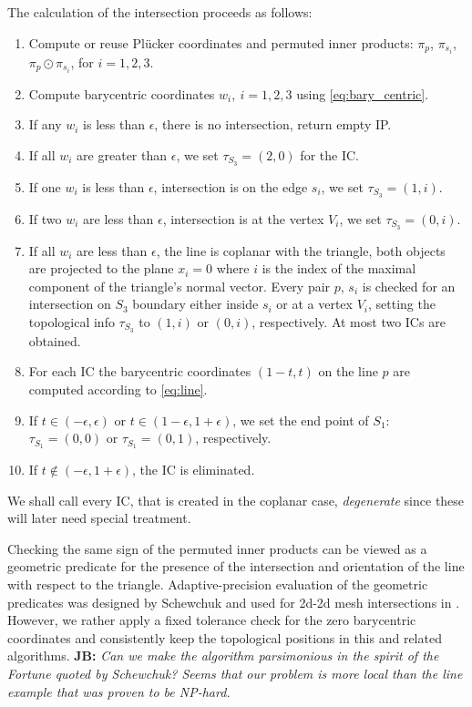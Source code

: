 \documentclass{elsarticle}
\newcommand{\noteJB}[1]{{\color{Blue} \textbf{JB: } \textit{#1}}}
\newcommand{\plucker}{Pl\"{u}cker }
\begin{document}
The calculation of the intersection proceeds as follows:
\begin{enumerate}
    \item Compute or reuse \plucker coordinates and permuted inner products: $\pi_p$, $\pi_{s_i}$, $\pi_p \odot \pi_{s_i}$, for $i=1,2,3$.
    \item Compute barycentric coordinates $w_i,\ i=1,2,3$ using \eqref{eq:bary_centric}.
    \item If any $w_i$ is less than $\epsilon$, there is no intersection, return empty IP.  
    \item If all $w_i$ are greater than $\epsilon$, we set $\tau_{S_3} = (2, 0)$ for the IC.
    \item If one $w_i$ is less than $\epsilon$, intersection is on the edge $s_i$, we set $\tau_{S_3} =(1,i)$.
    \item If two $w_i$ are less than $\epsilon$, intersection is at the vertex $V_i$, we set $\tau_{S_3}=(0,i)$.
    \item \label{item:coplanar} If all $w_i$ are less than $\epsilon$, the line is coplanar with the triangle, both objects are 
        projected to the plane $x_i=0$ where $i$ is the index of the maximal component of the triangle's normal vector.
        Every pair $p$, $s_i$ is checked for an intersection on $S_3$ boundary either inside $s_i$ or at a vertex $V_i$, setting the topological info $\tau_{S_3}$ to 
        $(1, i)$ or $(0, i)$, respectively. At most two ICs are obtained.
    \item For each IC the barycentric coordinates $(1-t, t)$ on the line $p$ are computed according to \eqref{eq:line}. 
    \item If $t\in (-\epsilon, \epsilon)$ or $t\in (1-\epsilon, 1+\epsilon)$,
        we set the end point of $S_1$: $\tau_{S_1} = (0,0)$ or $\tau_{S_1} = (0,1)$, respectively.
    \item If $t\notin (-\epsilon, 1+\epsilon)$, the IC is eliminated.
\end{enumerate}

We shall call every IC, that is created in the coplanar case, \emph{degenerate} since these will later need special treatment.

Checking the same sign of the permuted inner products can be viewed as a geometric predicate for the presence of the intersection and orientation of the 
line with respect to the triangle. Adaptive-precision evaluation of the geometric predicates was designed by Schewchuk \cite{shewchuk_adaptive_1997}
and used for 2d-2d mesh intersections in \cite{elsheikh_reliable_2012}. However, we rather apply a fixed tolerance check for the zero 
barycentric coordinates and consistently keep the topological positions in this and related algorithms. \noteJB{Can we make the algorithm 
\emph{parsimonious} in the spirit of the Fortune \cite{fortune_stable_1989} quoted by Schewchuk? 
Seems that our problem is more local than the line example that was proven to be NP-hard.}
\end{document}
